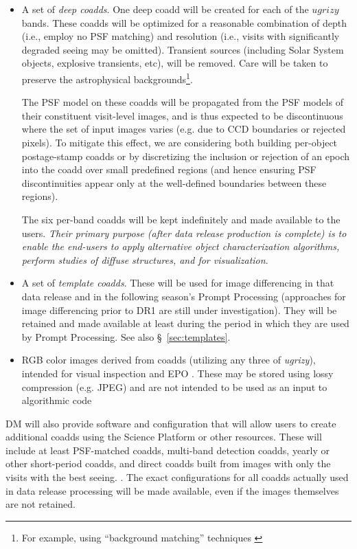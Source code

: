 \begin{itemize}
    \item A set of \emph{deep coadds}. One deep coadd will be created for each of the $ugrizy$ bands. These coadds will be optimized for a reasonable combination of depth (i.e., employ no PSF matching) and resolution (i.e., visits with significantly degraded seeing may be omitted). Transient sources (including Solar System objects, explosive transients, etc), will be removed. Care will be taken to preserve the astrophysical backgrounds\footnote{For example, using ``background matching'' techniques \citep{DMTN-035}}.

The PSF model on these coadds will be propagated from the PSF models of their constituent visit-level images, and is thus expected to be discontinuous where the set of input images varies (e.g. due to CCD boundaries or rejected pixels).
To mitigate this effect, we are considering both building per-object postage-stamp coadds or by discretizing the inclusion or rejection of an epoch into the coadd over small predefined regions (and hence ensuring PSF discontinuities appear only at the well-defined boundaries between these regions).

The six per-band coadds will be kept indefinitely and made available to the users. \emph{Their primary purpose (after data release production is complete) is to enable the end-users to apply alternative object characterization algorithms, perform studies of diffuse structures, and for visualization}.

    \item A set of \emph{template coadds}.  These will be used for image differencing in that data release and in the following season's Prompt Processing (approaches for image differencing prior to DR1 are still under investigation).  They will be retained and made available at least during the period in which they are used by Prompt Processing.  See also \S~\ref{sec:templates}.

    \item RGB color images derived from coadds (utilizing any three of \textit{ugrizy}), intended for visual inspection and EPO .  
    These may be stored using lossy compression (e.g. JPEG) and are not intended to be used as an input to algorithmic code
\end{itemize}

DM will also provide software and configuration that will allow users to create additional coadds using the Science Platform or other resources. 
These will include at least PSF-matched coadds, multi-band detection coadds, yearly or other short-period coadds, and direct coadds built from images with only the visits with the best seeing. .
The exact configurations for all coadds actually used in data release processing will be made available, even if the images themselves are not retained.

